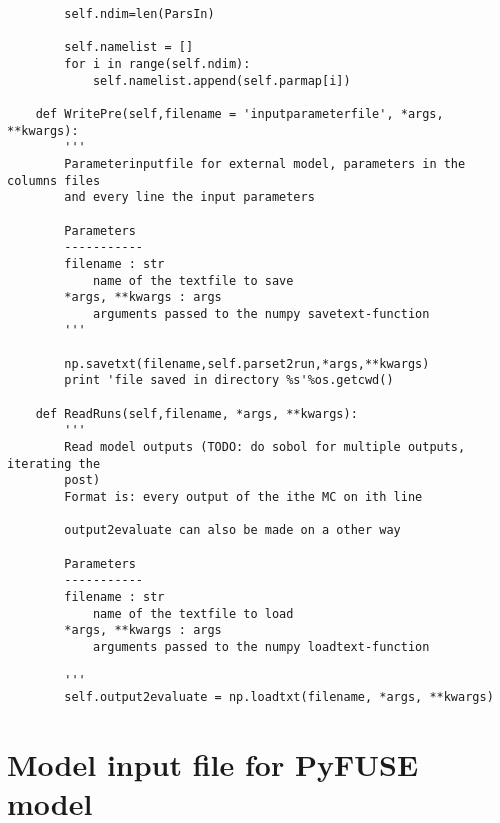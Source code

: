 \begin{lstlisting}
        self.ndim=len(ParsIn)

        self.namelist = [] 
        for i in range(self.ndim):
            self.namelist.append(self.parmap[i])        

    def WritePre(self,filename = 'inputparameterfile', *args, **kwargs):
        '''
        Parameterinputfile for external model, parameters in the columns files
        and every line the input parameters
        
        Parameters
        -----------
        filename : str
            name of the textfile to save
        *args, **kwargs : args
            arguments passed to the numpy savetext-function
        '''
        
        np.savetxt(filename,self.parset2run,*args,**kwargs)
        print 'file saved in directory %s'%os.getcwd()
          
    def ReadRuns(self,filename, *args, **kwargs): 
        '''
        Read model outputs (TODO: do sobol for multiple outputs, iterating the
        post)
        Format is: every output of the ithe MC on ith line
        
        output2evaluate can also be made on a other way

        Parameters
        -----------
        filename : str
            name of the textfile to load    
        *args, **kwargs : args
            arguments passed to the numpy loadtext-function
            
        '''
        self.output2evaluate = np.loadtxt(filename, *args, **kwargs)
\end{lstlisting}




\section{Model input file for PyFUSE model \label{inpufile}}

